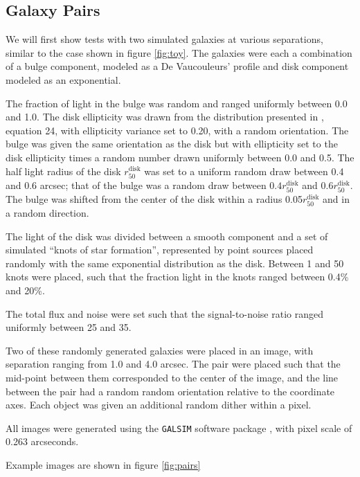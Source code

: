 \documentclass[fleqn,useAMS,usenatbib]{mnras}
\begin{document}
\subsection{Galaxy Pairs} \label{sec:pairs}

We will first show tests with two simulated galaxies at various separations,
similar to the case shown in figure \ref{fig:toy}.  The galaxies were each a
combination of a bulge component, modeled as a De Vaucouleurs' profile
\citep{devauc1948} and disk component modeled as an exponential.

The fraction of light in the bulge was random and ranged uniformly between 0.0
and 1.0. The disk ellipticity was drawn from the distribution presented in
\cite{ba14}, equation 24, with ellipticity variance set to 0.20, with a random
orientation.  The bulge was given the same orientation as the disk but with
ellipticity set to the disk ellipticity times a random number drawn uniformly
between 0.0 and 0.5.  The half light radius of the disk
$r_{50}^{\mathrm{disk}}$ was set to a uniform random draw between 0.4 and 0.6
arcsec; that of the bulge was a random draw between $0.4
r_{50}^{\mathrm{disk}}$ and $0.6 r_{50}^{\mathrm{disk}}$.  The bulge was
shifted from the center of the disk within a radius
0.05$r_{50}^{\mathrm{disk}}$ and in a random direction.

The light of the disk was divided between a smooth component and a set of
simulated ``knots of star formation'', represented by point sources placed
randomly with the same exponential distribution as the disk.  Between 1 and 50
knots were placed, such that the fraction light in the knots ranged between
0.4\% and 20\%.

The total flux and noise were set such that the signal-to-noise ratio ranged
uniformly between 25 and 35.

Two of these randomly generated galaxies were placed in an image, with
separation ranging from 1.0 and 4.0 arcsec. The pair were placed such that the
mid-point between them corresponded to the center of the image, and the line
between the pair had a random random orientation relative to the coordinate
axes.  Each object was given an additional random dither within a pixel.

All images were generated using the \texttt{GALSIM} software package
\citep{GALSIM2015}, with pixel scale of 0.263 arcseconds.

Example images are shown in figure \ref{fig:pairs}
\end{document}
